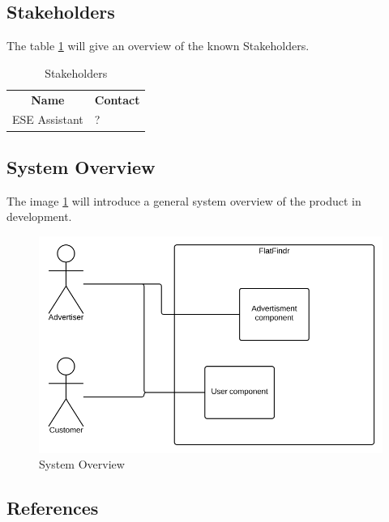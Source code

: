 \subsection{Stakeholders}
The table \ref{table-stakeholders} will give an overview of the known
Stakeholders.
\begin{table}[H]
	\centering
	\begin{tabular}{ll}
	\multicolumn{1}{c}{\textbf{Name}} & \multicolumn{1}{c}{\textbf{Contact}} \\
	ESE Assistant & ?                                        
	\end{tabular}
	\caption{Stakeholders}
	\label{table-stakeholders}
\end{table}

\subsection{System Overview}
The image \ref{image-system-overview} will introduce a general system overview
of the product in development.
\begin{figure}[p]
    \centering
	\includegraphics[width=12cm]{images/system-overview}
	\caption{System Overview}
    \label{image-system-overview}
\end{figure}

\subsection{References}
